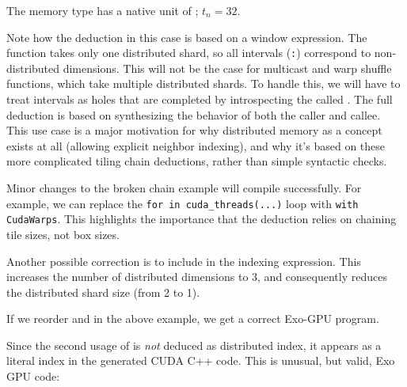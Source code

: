 The  memory type has a native unit of ; $t_n = 32$.



Note how the deduction in this case is based on a window expression.
The  function takes only one distributed shard, so all intervals (\texttt{:}) correspond to non-distributed dimensions.
This will not be the case for multicast and warp shuffle functions, which take multiple distributed shards.
To handle this, we will have to treat intervals as holes that are completed by introspecting the called .
The full deduction is based on synthesizing the behavior of both the caller and callee.
This use case is a major motivation for why distributed memory as a concept exists at all (allowing explicit neighbor indexing), and why it's based on these more complicated tiling chain deductions, rather than simple syntactic checks.

\filbreak
{}



\filbreak
{}

Minor changes to the broken chain example will compile successfully.
For example, we can replace the \texttt{for  in cuda\_threads(...)} loop with \texttt{with CudaWarps}.
This highlights the importance that the deduction relies on chaining tile sizes, not box sizes.



Another possible correction is to include \texttt{} in the indexing expression.
This increases the number of distributed dimensions to 3, and consequently reduces the distributed shard size (from 2 to 1).



\filbreak
{}



\filbreak
{}

If we reorder  and  in the above example, we get a correct Exo-GPU program.



Since the second usage of  is \textit{not} deduced as distributed index, it appears as a literal index in the generated CUDA C++ code.
This is unusual, but valid, Exo GPU code:



\filbreak
{}




